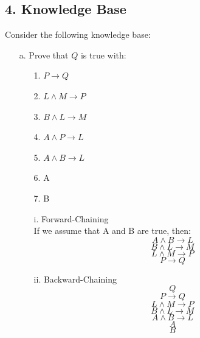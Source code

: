 \documentclass[11pt]{article}
\begin{document}
\begin{flushleft}
\section*{4. Knowledge Base} Consider the following knowledge base:

\begin{enumerate}

    \item[a.] Prove that $Q$ is true with:

        \begin{center}
            \begin{minipage}{0.4\textwidth}
                \begin{enumerate}
                    \item[1.] $P \rightarrow Q$
                    \item[2.] $L \land M \rightarrow P$
                    \item[3.] $B \land L \rightarrow M$
                    \item[4.] $A \land P \rightarrow L$
                    \item[5.] $A \land B \rightarrow L$
                    \item[6.] A
                    \item[7.] B
                \end{enumerate}
            \end{minipage}
        \end{center}

        \begin{enumerate}
            \item[i.] Forward-Chaining \\
                If we assume that A and B are true, then:
                $$ A \wedge B \rightarrow L $$
                $$ B \wedge L \rightarrow M $$
                $$ L \wedge M \rightarrow P $$
                $$ P \rightarrow Q $$
            \item[ii.] Backward-Chaining
                $$ Q $$
                $$ P \rightarrow Q $$
                $$ L \wedge M \rightarrow P $$
                $$ B \wedge L \rightarrow M $$
                $$ A \wedge B \rightarrow L $$
                $$ A $$
                $$ B $$


\end{enumerate}
\end{enumerate}
\end{flushleft}
\end{document}
